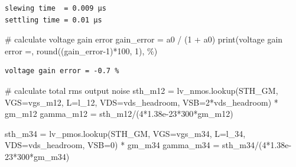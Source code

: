 \documentclass[
  a4paper,
  DIV=11,
  numbers=noendperiod]{scrartcl}
\newenvironment{Shaded}{\begin{snugshade}}{\end{snugshade}}
\newcommand{\BuiltInTok}[1]{\textcolor[rgb]{0.00,0.23,0.31}{#1}}
\newcommand{\CommentTok}[1]{\textcolor[rgb]{0.37,0.37,0.37}{#1}}
\newcommand{\DecValTok}[1]{\textcolor[rgb]{0.68,0.00,0.00}{#1}}
\newcommand{\FloatTok}[1]{\textcolor[rgb]{0.68,0.00,0.00}{#1}}
\newcommand{\NormalTok}[1]{\textcolor[rgb]{0.00,0.23,0.31}{#1}}
\newcommand{\OperatorTok}[1]{\textcolor[rgb]{0.37,0.37,0.37}{#1}}
\newcommand{\StringTok}[1]{\textcolor[rgb]{0.13,0.47,0.30}{#1}}
\begin{document}
\begin{tcolorbox}
\begin{verbatim}
slewing time  = 0.009 µs
settling time = 0.01 µs
\end{verbatim}

\begin{Shaded}
\begin{Highlighting}[]
\CommentTok{\# calculate voltage gain error}
\NormalTok{gain\_error }\OperatorTok{=}\NormalTok{ a0 }\OperatorTok{/}\NormalTok{ (}\DecValTok{1} \OperatorTok{+}\NormalTok{ a0)}
\BuiltInTok{print}\NormalTok{(}\StringTok{\textquotesingle{}voltage gain error =\textquotesingle{}}\NormalTok{, }\BuiltInTok{round}\NormalTok{((gain\_error}\OperatorTok{{-}}\DecValTok{1}\NormalTok{)}\OperatorTok{*}\DecValTok{100}\NormalTok{, }\DecValTok{1}\NormalTok{), }\StringTok{\textquotesingle{}\%\textquotesingle{}}\NormalTok{)}
\end{Highlighting}
\end{Shaded}

\begin{verbatim}
voltage gain error = -0.7 %
\end{verbatim}

\begin{Shaded}
\begin{Highlighting}[]
\CommentTok{\# calculate total rms output noise}
\NormalTok{sth\_m12 }\OperatorTok{=}\NormalTok{ lv\_nmos.lookup(}\StringTok{\textquotesingle{}STH\_GM\textquotesingle{}}\NormalTok{, VGS}\OperatorTok{=}\NormalTok{vgs\_m12, L}\OperatorTok{=}\NormalTok{l\_12, VDS}\OperatorTok{=}\NormalTok{vds\_headroom, VSB}\OperatorTok{=}\DecValTok{2}\OperatorTok{*}\NormalTok{vds\_headroom) }\OperatorTok{*}\NormalTok{ gm\_m12}
\NormalTok{gamma\_m12 }\OperatorTok{=}\NormalTok{ sth\_m12}\OperatorTok{/}\NormalTok{(}\DecValTok{4}\OperatorTok{*}\FloatTok{1.38e{-}23}\OperatorTok{*}\DecValTok{300}\OperatorTok{*}\NormalTok{gm\_m12)}

\NormalTok{sth\_m34 }\OperatorTok{=}\NormalTok{ lv\_pmos.lookup(}\StringTok{\textquotesingle{}STH\_GM\textquotesingle{}}\NormalTok{, VGS}\OperatorTok{=}\NormalTok{vgs\_m34, L}\OperatorTok{=}\NormalTok{l\_34, VDS}\OperatorTok{=}\NormalTok{vds\_headroom, VSB}\OperatorTok{=}\DecValTok{0}\NormalTok{) }\OperatorTok{*}\NormalTok{ gm\_m34}
\NormalTok{gamma\_m34 }\OperatorTok{=}\NormalTok{ sth\_m34}\OperatorTok{/}\NormalTok{(}\DecValTok{4}\OperatorTok{*}\FloatTok{1.38e{-}23}\OperatorTok{*}\DecValTok{300}\OperatorTok{*}\NormalTok{gm\_m34)}


\end{Highlighting}
\end{Shaded}
\end{tcolorbox}
\end{document}
